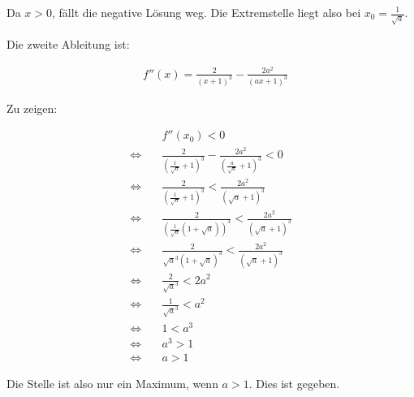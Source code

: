 \documentclass[a4paper,german,12pt,smallheadings]{scrartcl}
\begin{document}
Da $x > 0$, fällt die negative Lösung weg. Die Extremstelle liegt also bei $x_0
= \frac{1}{\sqrt{a}}$.

Die zweite Ableitung ist:

\begin{align*}
  &f''(x) = \frac{2}{(x+1)^3} - \frac{2a^2}{(ax+1)^3}
\end{align*}

Zu zeigen:

\begin{align*}
  &f''(x_0) < 0\\
  \Leftrightarrow\quad&\frac{2}{(\frac{1}{\sqrt{a}}+1)^3} - \frac{2a^2}{(\frac{a}{\sqrt{a}}+1)^3} < 0 \\
  \Leftrightarrow\quad&\frac{2}{(\frac{1}{\sqrt{a}}+1)^3} < \frac{2a^2}{(\sqrt{a}+1)^3} \\
  \Leftrightarrow\quad&\frac{2}{(\frac{1}{\sqrt{a}}(1+\sqrt{a}))^3} < \frac{2a^2}{(\sqrt{a}+1)^3} \\
  \Leftrightarrow\quad&\frac{2}{\sqrt{a}^3 (1+\sqrt{a})^3} < \frac{2a^2}{(\sqrt{a}+1)^3} \\
  \Leftrightarrow\quad&\frac{2}{\sqrt{a}^3} < 2a^2 \\
  \Leftrightarrow\quad&\frac{1}{\sqrt{a}^3} < a^2 \\
  \Leftrightarrow\quad& 1 < a^3 \\
  \Leftrightarrow\quad& a^3 > 1\\
  \Leftrightarrow\quad& a > 1
\end{align*}

Die Stelle ist also nur ein Maximum, wenn $a > 1$. Dies ist gegeben.
\end{document}
